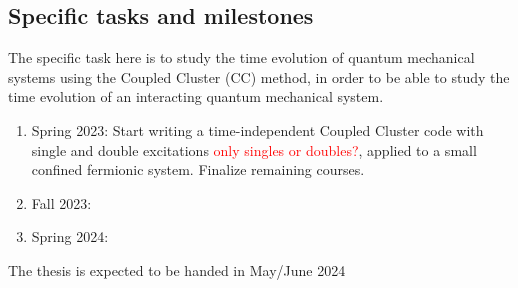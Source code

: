 \documentclass{article}
\newcommand{\comment}[1]{\textcolor{red}{#1}}
\begin{document}
\subsection*{Specific tasks and milestones}

The specific task here is to study the time evolution of quantum
mechanical systems using the Coupled Cluster (CC) method, in order to
be able to study the time evolution of an interacting quantum
mechanical system.

\begin{enumerate}
    \item Spring 2023: Start writing a time-independent Coupled Cluster code with single and double excitations \comment{only singles or doubles?}, applied to a small confined fermionic system. Finalize remaining courses. 
    \item Fall 2023:
    \item Spring 2024:
\end{enumerate}
The thesis is expected to be handed in May/June 2024



\printbibliography
\end{document}
